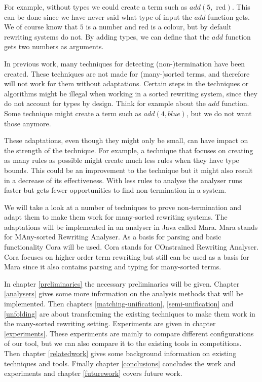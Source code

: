 For example, without types we could create a term such as $add(5, \text{ red})$. This can be done since we have never said what type of input the $add$ function gets. We of course know that $5$ is a number and red is a colour, but by default rewriting systems do not. By adding types, we can define that the $add$ function gets two numbers as arguments.

In previous work, many techniques for detecting (non-)termination have been created. These techniques are not made for (many-)sorted terms, and therefore will not work for them without adaptations. Certain steps in the techniques or algorithms might be illegal when working in a sorted rewriting system, since they do not account for types by design. Think for example about the $add$ function. Some technique might create a term such as $add(4, blue)$, but we do not want those anymore. 

These adaptations, even though they might only be small, can have impact on the strength of the technique. For example, a technique that focuses on creating as many rules as possible might create much less rules when they have type bounds. This could be an improvement to the technique but it might also result in a decrease of its effectiveness. With less rules to analyse the analyser runs faster but gets fewer opportunities to find non-termination in a system. 

We will take a look at a number of techniques to prove non-termination and adapt them to make them work for many-sorted rewriting systems. The adaptations will be implemented in an analyser in Java called Mara. Mara stands for MAny-sorted Rewriting Analyser. As a basis for parsing and basic functionality Cora will be used. Cora stands for COnstrained Rewriting Analyser. Cora focuses on higher order term rewriting but still can be used as a basis for Mara since it also contains parsing and typing for many-sorted terms. 

In chapter \ref{preliminaries} the necessary preliminaries will be given. Chapter \ref{analysers} gives some more information on the analysis methods that will be implemented. Then chapters \ref{matching-unification}, \ref{semi-unification} and \ref{unfolding} are about transforming the existing techniques to make them work in the many-sorted rewriting setting. Experiments are given in chapter \ref{experiments}. These experiments are mainly to compare different configurations of our tool, but we can also compare it to the existing tools in competitions. Then chapter \ref{relatedwork} gives some background information on existing techniques and tools. Finally chapter \ref{conclusions} concludes the work and experiments and chapter \ref{futurework} covers future work. 